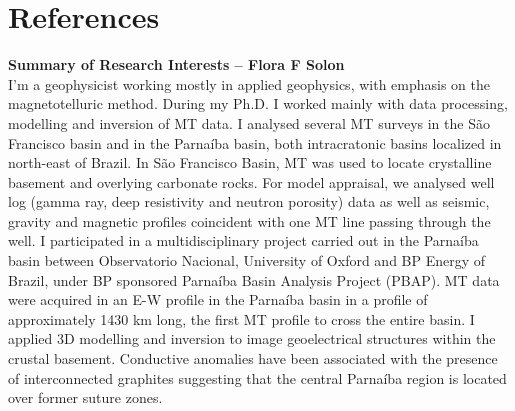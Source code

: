 \documentclass[10pt,a4paper,sans]{moderncv} %
\begin{document}
\section{References}










\clearpage

\textbf{Summary of Research Interests -- Flora F Solon}\\

I'm a geophysicist working mostly in applied geophysics, with emphasis on the magnetotelluric method. During my Ph.D. I worked mainly with data processing, modelling and inversion of MT data. I analysed several MT surveys in the S\~{a}o Francisco basin and in the Parna\'{i}ba basin, both intracratonic basins localized in north-east of Brazil. In S\~{a}o Francisco Basin, MT was used to locate crystalline basement and overlying carbonate rocks. For model appraisal, we analysed well log (gamma ray, deep resistivity and neutron porosity) data as well as seismic, gravity and magnetic profiles coincident with one MT line passing through the well. I participated in a multidisciplinary project carried out in the Parna\'{i}ba basin between Observatorio Nacional, University of Oxford and BP Energy of Brazil, under BP sponsored Parna\'{i}ba Basin Analysis Project (PBAP). MT data were acquired in an E-W profile in the Parna\'{i}ba basin in a profile of approximately 1430 km long, the first MT profile to cross the entire basin. I applied 3D modelling and inversion to image geoelectrical structures within the crustal basement. Conductive anomalies have been associated with the presence of interconnected graphites suggesting that the central Parna\'{i}ba region is located over former suture zones.
\end{document}
